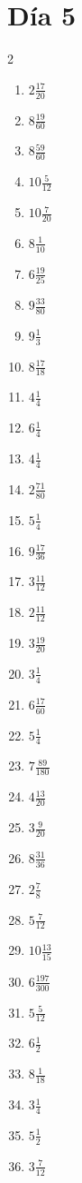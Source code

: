 \documentclass[12pt]{article}
\begin{document}
\section*{Día 5}
\begin{multicols}{2}\begin{enumerate}
\item $ 2 \frac{17}{20} $
\item $ 8 \frac{19}{60} $
\item $ 8 \frac{59}{60} $
\item $ 10 \frac{5}{12} $
\item $ 10 \frac{7}{20} $
\item $ 8 \frac{1}{10} $
\item $ 6 \frac{19}{25} $
\item $ 9 \frac{33}{80} $
\item $ 9 \frac{1}{3} $
\item $ 8 \frac{17}{18} $
\item $ 4 \frac{1}{4} $
\item $ 6 \frac{1}{4} $
\item $ 4 \frac{1}{4} $
\item $ 2 \frac{71}{80} $
\item $ 5 \frac{1}{4} $
\item $ 9 \frac{17}{36} $
\item $ 3 \frac{11}{12} $
\item $ 2 \frac{11}{12} $
\item $ 3 \frac{19}{20} $
\item $ 3 \frac{1}{4} $
\item $ 6 \frac{17}{60} $
\item $ 5 \frac{1}{4} $
\item $ 7 \frac{89}{180} $
\item $ 4 \frac{13}{20} $
\item $ 3 \frac{9}{20} $
\item $ 8 \frac{31}{36} $
\item $ 2 \frac{7}{8} $
\item $ 5 \frac{7}{12} $
\item $ 10 \frac{13}{15} $
\item $ 6 \frac{197}{300} $
\item $ 5 \frac{5}{12} $
\item $ 6 \frac{1}{2} $
\item $ 8 \frac{1}{18} $
\item $ 3 \frac{1}{4} $
\item $ 5 \frac{1}{2} $
\item $ 3 \frac{7}{12} $

\end{enumerate}
\end{multicols}
\end{document}

